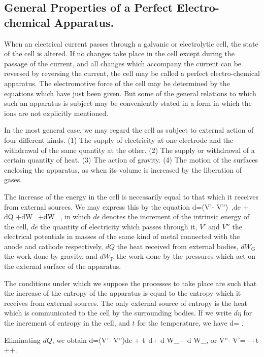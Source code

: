 \documentclass[12pt]{article}
\begin{document}
\subsection{General Properties of a Perfect Electro-chemical Apparatus.}
When an electrical current passes through a galvanic or electrolytic cell, the state of the cell is altered. If no changes take place in the cell except during the passage of the current, and all changes which accompany the current can be reversed by reversing the current, the cell may be called a perfect electro-chemical apparatus. The electromotive force of the cell may be determined by the equations which have just been given. But some of the general relations to which such an apparatus is subject may be conveniently stated in a form in which the ions are not explicitly mentioned.

In the most general case, we may regard the cell as subject to external action of four different kinds. (1) The supply of electricity at one electrode and the withdrawal of the same quantity at the other. (2) The supply or withdrawal of a certain quantity of heat. (3) The action of gravity. (4) The motion of the surfaces enclosing the apparatus, as when its volume is increased by the liberation of gases.

The increase of the energy in the cell is necessarily equal to that which it receives from external sources. We may express this by the equation
\eqs d\epsilon=(V'- V'')\ ,de + dQ +dW_+dW_, \label{691} \eqe
in which $d\epsilon$ denotes the increment of the intrinsic energy of the cell, $de$ the quantity of electricity which passes through it, $V'$ and $V''$ the electrical potentials in masses of the same kind of metal connected with the anode and cathode respectively, $dQ$ the heat received from external bodies, $dW_\text{G}$ the work done by gravity, and $dW_\text{P}$ the work done by the pressures which act on the external surface of the apparatus.

The conditions under which we suppose the processes to take place are such that the increase of the entropy of the apparatus is equal to the entropy which it receives from external sources. The only external source of entropy is the heat which is communicated to the cell by the surrounding bodies. If we write $d\eta$ for the increment of entropy in the cell, and $t$ for the temperature, we have
\eqs d\eta = .\label{692} \eqe

Eliminating $dQ$, we obtain
\eqs d\epsilon=(V'- V'')de + t\, d\eta + d W_+ d W_, \label{693} \eqe
or
\eqs V''- V'= -+t ++. \label{694} \eqe
\end{document}
